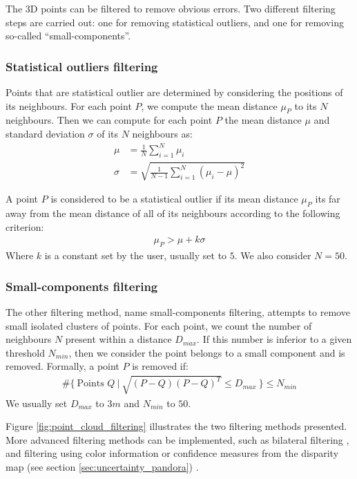 The 3D points can be filtered to remove obvious errors. Two different filtering steps are carried out: one for removing statistical outliers, and one for removing so-called ``small-components''. 
\subsubsection{Statistical outliers filtering}
Points that are statistical outlier are determined by considering the positions of its neighbours. For each point $P$, we compute the mean distance $\mu_P$ to its $N$ neighbours. Then we can compute for each point $P$ the mean distance $\mu$ and standard deviation $\sigma$ of its $N$ neighbours as:
\begin{align}
    \mu &= \frac{1}{N}\sum_{i=1}^N\mu_i\\
    \sigma &= \sqrt{\frac{1}{N-1}\sum_{i=1}^N(\mu_i-\mu)^2}
\end{align}

A point $P$ is considered to be a statistical outlier if its mean distance $\mu_P$ its far away from the mean distance of all of its neighbours according to the following criterion:
\begin{align}
    \mu_P>\mu+k\sigma
\end{align}
Where $k$ is a constant set by the user, usually set to $5$. We also consider $N=50$.

\subsubsection{Small-components filtering}
The other filtering method, name small-components filtering, attempts to remove small isolated clusters of points. For each point, we count the number of neighbours $N$ present within a distance $D_{max}$. If this number is inferior to a given threshold $N_{min}$, then we consider the point belongs to a small component and is removed. Formally, a point $P$ is removed if:
\begin{align}
    \#\{~\text{Points } Q~|~\sqrt{(P-Q)(P-Q)^T}\leqslant D_{max}~\}\leqslant N_{min}
\end{align}
We usually set $D_{max}$ to $3m$ and $N_{min}$ to $50$.

Figure \ref{fig:point_cloud_filtering} illustrates the two filtering methods presented. More advanced filtering methods can be implemented, such as bilateral filtering \cite{digne_bilateral_2017}, and filtering using color information or confidence measures from the disparity map (see section \ref{sec:uncertainty_pandora}) \cite{youssefi_geometrically_2024}.

